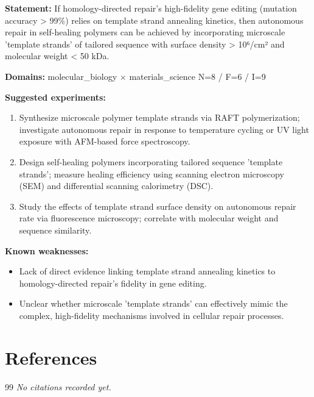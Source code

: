 \documentclass[12pt,a4paper]{article}
\begin{document}
\textbf{Statement:} If homology-directed repair's high-fidelity gene editing (mutation accuracy > 99\%) relies on template strand annealing kinetics, then autonomous repair in self-healing polymers can be achieved by incorporating microscale 'template strands' of tailored sequence with surface density > 10⁶/cm² and molecular weight < 50 kDa.

\noindent\textbf{Domains:} molecular\_biology $\times$ materials\_science
\hspace{1em} N=8 / F=6 / I=9

\textbf{Suggested experiments:}
\begin{enumerate}
  \item Synthesize microscale polymer template strands via RAFT polymerization; investigate autonomous repair in response to temperature cycling or UV light exposure with AFM-based force spectroscopy.
  \item Design self-healing polymers incorporating tailored sequence 'template strands'; measure healing efficiency using scanning electron microscopy (SEM) and differential scanning calorimetry (DSC).
  \item Study the effects of template strand surface density on autonomous repair rate via fluorescence microscopy; correlate with molecular weight and sequence similarity.
\end{enumerate}

\textbf{Known weaknesses:}
\begin{itemize}
  \item Lack of direct evidence linking template strand annealing kinetics to homology-directed repair's fidelity in gene editing.
  \item Unclear whether microscale 'template strands' can effectively mimic the complex, high-fidelity mechanisms involved in cellular repair processes.
\end{itemize}


\section{References}

\begin{thebibliography}{99}
\textit{No citations recorded yet.}
\end{thebibliography}
\end{document}

